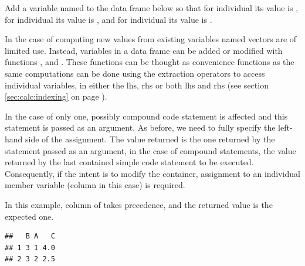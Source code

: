 \documentclass[krantz2]{krantz}\usepackage{knitr}
\begin{document}
\begin{advplayground}
Add a variable named  to the data frame below so that for individual  its value is , for individual  its value is , and for individual  its value is .
\begin{knitrout}\footnotesize
{}\color{fgcolor}\begin{kframe}
\begin{alltt}
 \hlkwb{<-} \hlstd{(} \hlstd{=} \hlstd{(}\hlstd{(}\hlstd{,} \hlstd{,} \hlstd{),} \hlstd{),}
                     \hlstd{=} \hlstd{(}\hlstd{,} \hlstd{,} \hlstd{,} \hlstd{,} \hlstd{,} \hlstd{))}
\end{alltt}
\end{kframe}
\end{knitrout}
\end{advplayground}

In the case of computing new values from existing variables named vectors are of limited use. Instead, variables in a data frame can be added or modified with \Rlang functions ,  and . These functions can be thought as convenience functions as the same computations can be done using the extraction operators to access individual variables, in either the lhs, rhs or both lhs and rhs (see section \ref{sec:calc:indexing} on page \pageref{sec:calc:indexing}).

In the case of  only one, possibly compound code statement is affected and this statement is passed as an argument. As before, we need to fully specify the left-hand side of the assignment. The value returned is the one returned by the statement passed as an argument, in the case of compound statements, the value returned by the last contained simple code statement to be executed. Consequently, if the intent is to modify the container, assignment to an individual member variable (column in this case) is required.

In this example, column  of  takes precedence, and the returned value is the expected one.

\begin{knitrout}\footnotesize
{}\color{fgcolor}\begin{kframe}
\begin{alltt}
\hlopt{$} \hlkwb{<-} 
\hlopt{$} \hlkwb{<-}  \hlopt{+}  \hlopt{/} 
 \hlstd{)}
\end{alltt}
\begin{verbatim}
##   B A   C
## 1 3 1 4.0
## 2 3 2 2.5
\end{verbatim}
\end{kframe}
\end{knitrout}
\end{document}
